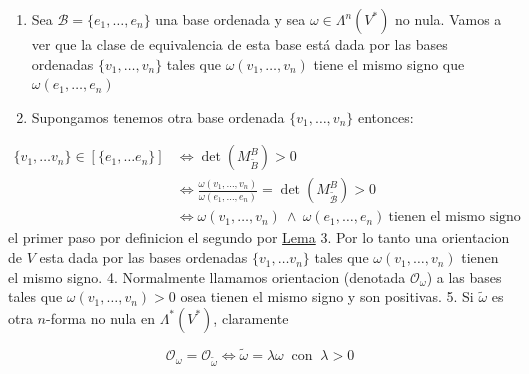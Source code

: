 \begin{bookproof}{}
\begin{enumerate}
\item Sea $\mathcal B=\{e_1,\ldots,e_n\}$ una base ordenada y sea $\omega\in\Lambda^n(V^*)$ no nula. Vamos a ver que la clase de equivalencia de esta base está dada por las bases ordenadas $\{v_1,\ldots,v_n\}$ tales que $\omega(v_1,\ldots,v_n)$ tiene el mismo signo que $\omega(e_1,\ldots,e_n)$
\item Supongamos tenemos otra base ordenada $\{ v_{1},\ldots,v_{n} \}$ entonces:
\end{enumerate}
\[
\begin{aligned}\{ v_{1},\ldots v_{n} \}\in [\{ e_{1},\ldots e_{n} \}]& \iff \det(M_{\widetilde{B}}^{B} )>0\\& \iff \frac{\omega(v_{1},\ldots,v_{n})}{\omega(e_{1},\ldots,e_{n})}=\det(M_{\widetilde{\mathcal B}}^{B} )>0\\&\iff \omega(v_{1},\ldots,v_{n})\ \land \ \omega(e_{1},\ldots,e_{n})\ \text{tienen el mismo signo}\end{aligned}
\]
el primer paso por definicion el segundo por \hyperref[blk:543d91]{Lema} 3. Por lo tanto una orientacion de $V$ esta dada por las bases ordenadas $\{ v_{1},\ldots v_{n} \}$ tales que $\omega(v_{1},\ldots,v_{n})$ tienen el mismo signo. 4. Normalmente llamamos orientacion (denotada $\mathcal{O}_{\omega}$) a las bases tales que $\omega(v_{1},\ldots,v_{n})>0$ osea tienen el mismo signo y son positivas. 5. Si $\widetilde{\omega}$ es otra $n$-forma no nula en $\Lambda^{*}(V^{*})$, claramente

\[
\mathcal{O}_{\omega}=\mathcal{O}_{\widetilde{\omega}}\iff \widetilde{\omega}=\lambda\omega \  \text{ con } \ \lambda>0
\]
\bookqed
\end{bookproof}
